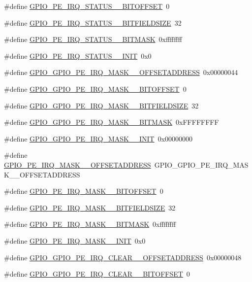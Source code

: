 \begin{DoxyCompactItemize}
\item 
\#define \hyperlink{a00553_ac0ff35a461c6d456c63ce6d48ae1d063}{GPIO\_\-PE\_\-IRQ\_\-STATUS\_\_\-BITOFFSET}~0
\item 
\#define \hyperlink{a00553_ac3568f0723d9dbca4df536464965a4a0}{GPIO\_\-PE\_\-IRQ\_\-STATUS\_\_\-BITFIELDSIZE}~32
\item 
\#define \hyperlink{a00553_a3b06196eda50f22c33c86b947a22bc24}{GPIO\_\-PE\_\-IRQ\_\-STATUS\_\_\-BITMASK}~0xffffffff
\item 
\#define \hyperlink{a00553_adfb161c2dbec481b5c25b1d67fd6cf9c}{GPIO\_\-PE\_\-IRQ\_\-STATUS\_\_\-INIT}~0x0
\item 
\#define \hyperlink{a00553_a274d117357bdfba4fb8954469710e024}{GPIO\_\-GPIO\_\-PE\_\-IRQ\_\-MASK\_\_\-OFFSETADDRESS}~0x00000044
\item 
\#define \hyperlink{a00553_af26125bed5c34298e37c04bc31477b89}{GPIO\_\-GPIO\_\-PE\_\-IRQ\_\-MASK\_\_\-BITOFFSET}~0
\item 
\#define \hyperlink{a00553_a7df843915cf1e8e670653119d16218b0}{GPIO\_\-GPIO\_\-PE\_\-IRQ\_\-MASK\_\_\-BITFIELDSIZE}~32
\item 
\#define \hyperlink{a00553_a0cbb0193772570b3589e50bff2ad497f}{GPIO\_\-GPIO\_\-PE\_\-IRQ\_\-MASK\_\_\-BITMASK}~0xFFFFFFFF
\item 
\#define \hyperlink{a00553_a7dd021fa7ebc5a6fc972c65a30516374}{GPIO\_\-GPIO\_\-PE\_\-IRQ\_\-MASK\_\_\-INIT}~0x00000000
\item 
\#define \hyperlink{a00553_a302ed20e22ea0c3c71cf39fa8a42d20a}{GPIO\_\-PE\_\-IRQ\_\-MASK\_\_\-OFFSETADDRESS}~GPIO\_\-GPIO\_\-PE\_\-IRQ\_\-MASK\_\_\-OFFSETADDRESS
\item 
\#define \hyperlink{a00553_a31e38bac8f8f3fa995cd2cbc34c90b69}{GPIO\_\-PE\_\-IRQ\_\-MASK\_\_\-BITOFFSET}~0
\item 
\#define \hyperlink{a00553_a047244cd105b83bde9dca6aac82affd0}{GPIO\_\-PE\_\-IRQ\_\-MASK\_\_\-BITFIELDSIZE}~32
\item 
\#define \hyperlink{a00553_a373a1427cbf45a35dd477bd02b5e6b2d}{GPIO\_\-PE\_\-IRQ\_\-MASK\_\_\-BITMASK}~0xffffffff
\item 
\#define \hyperlink{a00553_a1513fe6c91c99038f24c3f1dfc9cfdfb}{GPIO\_\-PE\_\-IRQ\_\-MASK\_\_\-INIT}~0x0
\item 
\#define \hyperlink{a00553_a4540e6c51d43829ebe2668338045e3fe}{GPIO\_\-GPIO\_\-PE\_\-IRQ\_\-CLEAR\_\_\-OFFSETADDRESS}~0x00000048
\item 
\#define \hyperlink{a00553_a4b8175e5d7f9edf950c09c1f016c0c23}{GPIO\_\-GPIO\_\-PE\_\-IRQ\_\-CLEAR\_\_\-BITOFFSET}~0

\end{DoxyCompactItemize}
